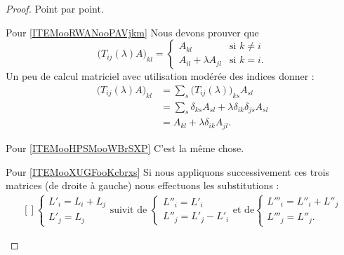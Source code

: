 \begin{proof}
    Point par point.
    \begin{subproof}
        \item[Pour \ref{ITEMooRWANooPAVjkm}]
            Nous devons prouver que
            \begin{equation}
                \big( T_{ij}(\lambda)A \big)_{kl}=\begin{cases}
                    A_{kl}    &   \text{si } k\neq i\\
                    A_{il}+\lambda A_{jl}    &    \text{si } k=i.
                \end{cases}
            \end{equation}
            Un peu de calcul matriciel avec utilisation modérée des indices donner :
            \begin{subequations}
                \begin{align}
                    \big( T_{ij}(\lambda)A \big)_{kl}&=\sum_s\big( T_{ij}(\lambda) \big)_{ks}A_{sl}\\
                    &=\sum_s\delta_{ks}A_{sl}+\lambda\delta_{ik}\delta_{js}A_{sl}\\
                    &=A_{kl}+\lambda\delta_{ik}A_{jl}.
                \end{align}
            \end{subequations}
        \item[Pour \ref{ITEMooHPSMooWBrSXP}] C'est la même chose.
        \item[Pour \ref{ITEMooXUGFooKcbrxs}] Si nous appliquons successivement ces trois matrices (de droite à gauche) nous effectuons les substitutions :
            \begin{equation}
                \begin{aligned}[]
                \begin{cases}
                    L'_i=L_i+L_j\\
                    L'_j=L_j
                \end{cases}
                \text{suivit de }
                \begin{cases}
                    L''_i=L'_i\\
                    L''_j=L'_j-L'_i
                \end{cases}
                \text{et de}
                \begin{cases}
                    L'''_i=L''_i+L''_j\\
                    L'''_j=L''_j.
                \end{cases}

\end{aligned}
\end{equation}
\end{subproof}
\end{proof}
